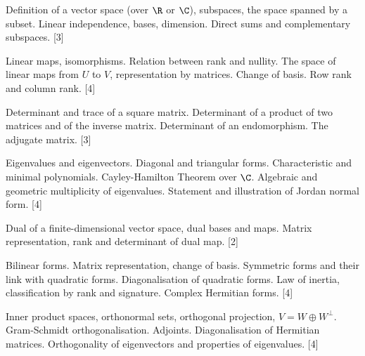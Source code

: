 \documentclass[a4paper]{article}
\begin{document}
\maketitle
{\small
\noindent Definition of a vector space (over $\R$ or $\C$), subspaces, the space spanned by a subset. Linear independence, bases, dimension. Direct sums and complementary subspaces. \hspace*{\fill} [3]

\vspace{5pt}
\noindent Linear maps, isomorphisms. Relation between rank and nullity. The space of linear maps from $U$ to $V$, representation by matrices. Change of basis. Row rank and column rank.\hspace*{\fill} [4]

\vspace{5pt}
\noindent Determinant and trace of a square matrix. Determinant of a product of two matrices and of the inverse matrix. Determinant of an endomorphism. The adjugate matrix.\hspace*{\fill} [3]

\vspace{5pt}
\noindent Eigenvalues and eigenvectors. Diagonal and triangular forms. Characteristic and minimal polynomials. Cayley-Hamilton Theorem over $\C$. Algebraic and geometric multiplicity of eigenvalues. Statement and illustration of Jordan normal form.\hspace*{\fill} [4]

\vspace{5pt}
\noindent Dual of a finite-dimensional vector space, dual bases and maps. Matrix representation, rank and determinant of dual map.\hspace*{\fill} [2]

\vspace{5pt}
\noindent Bilinear forms. Matrix representation, change of basis. Symmetric forms and their link with quadratic forms. Diagonalisation of quadratic forms. Law of inertia, classification by rank and signature. Complex Hermitian forms.\hspace*{\fill} [4]

\vspace{5pt}
\noindent Inner product spaces, orthonormal sets, orthogonal projection, $V = W \oplus W^\bot$. Gram-Schmidt orthogonalisation. Adjoints. Diagonalisation of Hermitian matrices. Orthogonality of eigenvectors and properties of eigenvalues.\hspace*{\fill} [4]}

\tableofcontents
\setcounter{section}{-1}
\end{document}
